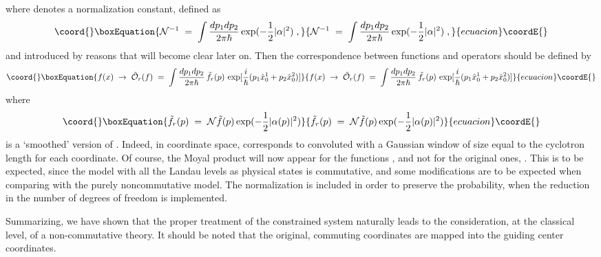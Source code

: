 \documentclass[a4paper,12pt]{article}
\begin{document}
where \coordHE{} denotes a normalization constant, defined as
\begin{equation}\coord{}\boxEquation{
  \label{eq:defcaln}
{\mathcal N}^{-1} \;=\; \int \frac{dp_1 dp_2}{2\pi \hbar} \exp
(-\frac{1}{2} |\alpha|^2 )
\;,
}{
  {\mathcal N}^{-1} \;=\; \int \frac{dp_1 dp_2}{2\pi \hbar} \exp
(-\frac{1}{2} |\alpha|^2 )
\;,
}{ecuacion}\coordE{}\end{equation}
and introduced by reasons that will become clear later on.  Then
the
correspondence between functions and operators should be defined by
\begin{equation}\coord{}\boxEquation{
  \label{eq:red5}
  f(x) \;\to \; {\hat {\mathcal O}}_r(f)\;=\; \int \frac{dp_1
dp_2}{2\pi \hbar}\,
    {\tilde f}_r(p) \, \exp [ \frac{i}{\hbar} (p_1 {\hat x}^1_0 +
p_2 
{\hat x}^2_0)]
}{
  f(x) \;\to \; {\hat {\mathcal O}}_r(f)\;=\; \int \frac{dp_1
dp_2}{2\pi \hbar}\,
    {\tilde f}_r(p) \, \exp [ \frac{i}{\hbar} (p_1 {\hat x}^1_0 +
p_2 
{\hat x}^2_0)]
}{ecuacion}\coordE{}\end{equation}
where
\begin{equation}\coord{}\boxEquation{
  \label{eq:deff0}
{\tilde f}_r(p) \;=\; {\mathcal N} {\tilde f}(p) \exp (-\frac{1}{2}
|\alpha (p)|^2 ) 
}{
  {\tilde f}_r(p) \;=\; {\mathcal N} {\tilde f}(p) \exp (-\frac{1}{2}
|\alpha (p)|^2 ) 
}{ecuacion}\coordE{}\end{equation}
is a `smoothed' version of \coordHE{}. Indeed, in coordinate space, \coordHE{}
corresponds to \coordHE{} convoluted with a Gaussian window of size equal
to
the cyclotron length for each coordinate. Of course, the Moyal
product
will now appear for the functions \coordHE{}, and not for the original
ones, \coordHE{}. This is to be expected, since the model with all the
Landau
levels as physical states is commutative, and some modifications
are
to be expected when comparing with the purely noncommutative model.
The normalization \coordHE{} is included in order to preserve
the
probability, when the reduction in the number of degrees of freedom
is
implemented.

Summarizing, we have shown that the proper treatment of the
constrained system naturally leads to the consideration, at the
classical level, of a non-commutative theory.  It should be noted
that
the original, commuting coordinates are mapped into the guiding
center
coordinates.
\end{document}
